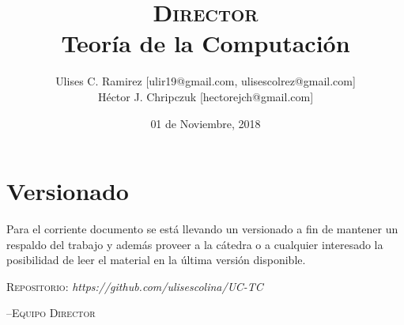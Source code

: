 \documentclass{report}
\title{\textsc{Director}\\Teoría de la Computación}
\author{Ulises C. Ramirez [ulir19@gmail.com, ulisescolrez@gmail.com]\\Héctor J.
Chripczuk [hectorejch@gmail.com]}
\date{01 de Noviembre, 2018}
\begin{document}
\maketitle
{}
\newpage
\section*{Versionado}
Para el corriente documento se est\'a llevando un versionado a fin de mantener
un respaldo del trabajo y adem\'as proveer a la c\'atedra o a cualquier
interesado la posibilidad de leer el material en la \'ultima versi\'on disponible.\\

\begin{center}
  \textsc{Repositorio}: \textit{https://github.com/ulisescolina/UC-TC}
\end{center}

\hfill--\textsc{Equipo Director}
\tableofcontents
\listoffigures
\lstlistoflistings
{}
\newpage








\newpage
\printbibliography[title={Referencias}]
\end{document}

